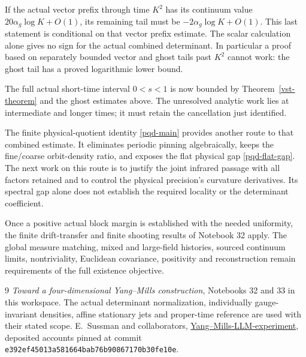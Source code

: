 \documentclass[11pt]{article}
\theoremstyle{remark}
\begin{document}
If the actual vector prefix through time \(K^2\)
has its continuum value \(20\alpha_g\log K+O(1)\),
its remaining tail must be
\(-2\alpha_g\log K+O(1)\).
This last statement is conditional on that vector
prefix estimate. The scalar calculation alone gives
no sign for the actual combined determinant.
In particular a proof based on separately bounded
vector and ghost tails past \(K^2\) cannot work:
the ghost tail has a proved logarithmic lower bound.

The full actual short-time interval \(0<s<1\) is
now bounded by Theorem~\ref{vst-theorem} and the
ghost estimates above. The unresolved analytic work
lies at intermediate and longer times; it must
retain the cancellation just identified.

The finite physical-quotient identity
\eqref{pqd-main} provides another route to that
combined estimate. It eliminates periodic pinning
algebraically, keeps the fine/coarse orbit-density
ratio, and exposes the flat physical gap
\eqref{pqd-flat-gap}. The next work on this route is
to justify the joint infrared passage with all
factors retained and to control the physical
precision's curvature derivatives. Its spectral
gap alone does not establish the required locality
or the determinant coefficient.

Once a positive actual block margin is established
with the needed uniformity, the finite drift-transfer
and finite shooting results of Notebook 32 apply.
The global measure matching, mixed and large-field
histories, sourced continuum limits, nontriviality,
Euclidean covariance, positivity and reconstruction
remain requirements of the full existence objective.

\begin{thebibliography}{9}
\emph{Toward a four-dimensional Yang--Mills construction},
Notebooks 32 and 33 in this workspace.
The actual determinant normalization, individually
gauge-invariant densities, affine stationary jets
and proper-time reference are used with their
stated scope.
E.~Sussman and collaborators,
\href{https://github.com/ethanwsussman/Yang--Mills-LLM-experiment}
{Yang--Mills-LLM-experiment}, deposited accounts pinned at
commit \texttt{e392ef4501\allowbreak 3a581664ba\allowbreak b76b908671\allowbreak 70b30fe10e}.
\end{thebibliography}
\end{document}
